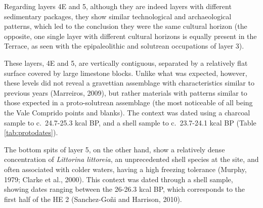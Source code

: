 \documentclass[12pt,twoside]{reedthesis}
\begin{document}
Regarding layers 4E and 5, although they are indeed layers with different sedimentary packages, they show similar technological and archaeological patterns, which led to the conclusion they were the same cultural horizon (the opposite, one single layer with different cultural horizons is equally present in the Terrace, as seen with the epipaleolithic and solutrean occupations of layer 3).

These layers, 4E and 5, are vertically contiguous, separated by a relatively flat surface covered by large limestone blocks. Unlike what was expected, however, these levels did not reveal a gravettian assemblage with characteristics similar to previous years (Marreiros, 2009), but rather materials with patterns similar to those expected in a proto-solutrean assemblage (the most noticeable of all being the Vale Comprido points and blanks). The context was dated using a charcoal sample to c.~24.7-25.3 kcal BP, and a shell sample to c.~23.7-24.1 kcal BP (Table \ref{tab:protodates}).

The bottom spits of layer 5, on the other hand, show a relatively dense concentration of \emph{Littorina littoreia}, an unprecedented shell species at the site, and often associated with colder waters, having a high freezing tolerance (Murphy, 1979; Clarke et al., 2000). This context was dated through a shell sample, showing dates ranging between the 26-26.3 kcal BP, which corresponds to the first half of the HE 2 (Sanchez-Goñi and Harrison, 2010).
\end{document}
